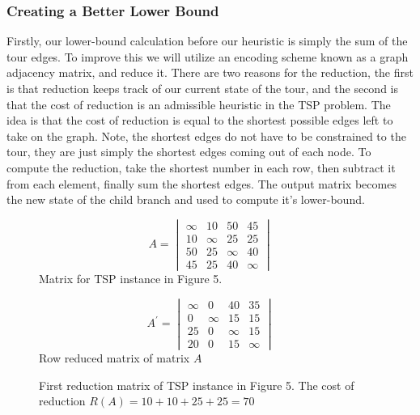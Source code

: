     \subsubsection{Creating a Better Lower Bound}
    Firstly, our lower-bound calculation before our heuristic is simply the sum 
    of the tour edges. To improve this we will utilize an encoding scheme known as 
    a graph adjacency matrix, and reduce it. There are two reasons for the reduction, 
    the first is that reduction keeps track of our current state of the tour, and the second
    is that the cost of reduction is an admissible heuristic in the TSP problem.
    The idea is that the cost of reduction is equal to the shortest possible edges left to
    take on the graph. Note, the shortest edges do not have to be constrained to the tour, they
    are just simply the shortest edges coming out of each node. To compute the reduction, take the
    shortest number in each row, then subtract it from each element, finally sum the shortest edges.
    The output matrix becomes the new state of the child branch and used to compute it's lower-bound.\\
    
    \begin{figure}[H]
        \begin{minipage}{.5\linewidth}
          \centering
          \begin{equation*}
            A = 
            \begin{vmatrix}
                \infty & 10 & 50 & 45\\
                10 & \infty & 25 & 25 \\
                50 & 25 & \infty & 40 \\
                45 & 25 & 40 & \infty
	        \end{vmatrix}
          \end{equation*}
          Matrix for TSP instance in Figure 5.
        \end{minipage}%
        \begin{minipage}{.5\linewidth}
          \centering
          \begin{equation*}
            A^{'} = 
                \begin{vmatrix}
                    \infty & 0 & 40 & 35\\
                    0 & \infty & 15 & 15 \\
                    25 & 0 & \infty & 15 \\
                    20 & 0 & 15 & \infty
                \end{vmatrix}
            \end{equation*}
          Row reduced matrix of matrix $A$\\
        \end{minipage}
        \caption{First reduction matrix of TSP instance in Figure 5.
                The cost of reduction $ R(A) = 10 + 10 + 25 + 25 = 70$}
      \end{figure}
      


